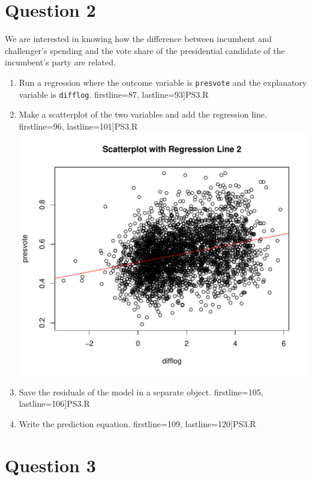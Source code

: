 \documentclass[12pt,letterpaper]{article}
\begin{document}
\section*{Question 2}
\noindent We are interested in knowing how the difference between incumbent and challenger's spending and the vote share of the presidential candidate of the incumbent's party are related.	\vspace{.25cm}
	\begin{enumerate}
		\item Run a regression where the outcome variable is \texttt{presvote} and the explanatory variable is \texttt{difflog}.	\vspace{0.2cm}
		 firstline=87, lastline=93]{PS3.R} 
		\item Make a scatterplot of the two variables and add the regression line. 	\vspace{0.2cm}
		 firstline=96, lastline=101]{PS3.R} 
		\noindent\includegraphics[width=.75\textwidth]{scatterplot2.pdf}
		\label{fig:scatterplot_2}
		\item Save the residuals of the model in a separate object.	\vspace{0.2cm}
		 firstline=105, lastline=106]{PS3.R} 
		\item Write the prediction equation.
		 firstline=109, lastline=120]{PS3.R} 
	\end{enumerate}
	
\section*{Question 3}
\end{document}
